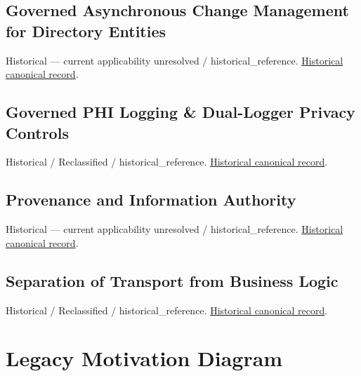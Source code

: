 \subsection{Governed Asynchronous Change Management for Directory Entities}

\par\label{element:11001a6ea3df45689a27216df641dac2}
Historical — current applicability unresolved / historical\_reference. \href{../../../../continuum/motivation/principle/11001a6ea3df45689a27216df641dac2.md}{Historical canonical record}.\par

\subsection{Governed PHI Logging \& Dual-Logger Privacy Controls}

\par\label{element:96ed278624c34ba4bfade0df08d45d74}
Historical / Reclassified / historical\_reference. \href{../../../../continuum/motivation/principle/96ed278624c34ba4bfade0df08d45d74.md}{Historical canonical record}.\par

\subsection{Provenance and Information Authority}

\par\label{element:638c501ba4df4c67aee92d1f328aad84}
Historical — current applicability unresolved / historical\_reference. \href{../../../../continuum/motivation/principle/638c501ba4df4c67aee92d1f328aad84.md}{Historical canonical record}.\par

\subsection{Separation of Transport from Business Logic}

\par\label{element:5ae28648334e4f6184044af0462eb9a8}
Historical / Reclassified / historical\_reference. \href{../../../../continuum/motivation/principle/5ae28648334e4f6184044af0462eb9a8.md}{Historical canonical record}.\par

\section{Legacy Motivation Diagram}

